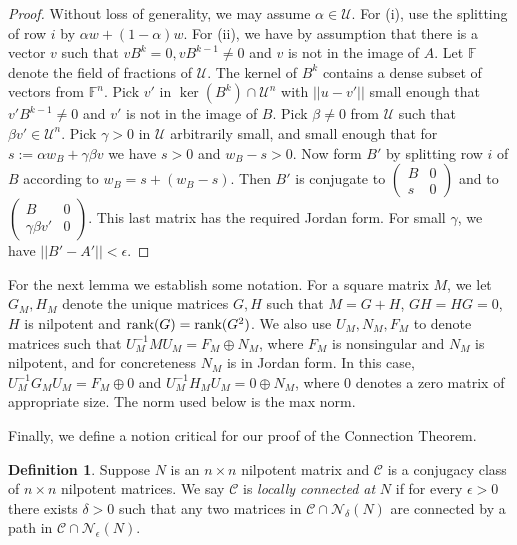 \documentclass{amsart}
\theoremstyle{definition}
\newtheorem{definition}[theorem]{Definition}
\theoremstyle{remark}
\numberwithin{equation}{section}
\begin{document}
{{\begin{proof}
 Without loss of generality, we may assume 
$\alpha \in \mathcal U$. 
For (i), use the splitting of  row $i$ by $\alpha w + (1-\alpha )w$. 
For (ii), we have by assumption that there is a vector $v$ 
such that $vB^k=0, vB^{k-1} \neq 0$ and $v$ is not in the image of 
$A$. Let $\mathbb F$ denote the field of fractions of $\mathcal U$. 
The kernel of $B^k$ contains a dense subset of vectors from 
$\mathbb F^n$. Pick $v'$ in $\ker(B^k)\cap \mathcal U^n$ with 
$||u-v'||$ small enough that $v'B^{k-1}\neq 0$ and 
$v'$ is not in the image of $B$. Pick $\beta \neq 0$ from $\mathcal U$ 
such that $\beta v'\in \mathcal U^n$. 
Pick $\gamma >0$ in $\mathcal U$ arbitrarily small, and small enough 
that for $s:= \alpha w_B + \gamma \beta v$ we have $s>0$ and 
$w_B-s>0$. Now form $B'$ by splitting row $i$ of $B$ according 
to  $w_B=s + (w_B -s)$. Then $B'$ is conjugate to 
$ \left(\begin{smallmatrix} B & 0 \\s & 0
\end{smallmatrix} \right)$ and to 
 $ \left(\begin{smallmatrix} B & 0 \\\gamma \beta v' & 0
\end{smallmatrix} \right)$. This last matrix has the required 
Jordan form. For small $\gamma$, we have $||B'-A'||< \epsilon$. 
\end{proof} 

For the next lemma we establish some notation. 
For a square matrix $M$, we let $G_M,H_M$ denote
the unique matrices $G,H$ such that $M=G+H$,
$GH=HG=0$, $H$ is nilpotent and $\textnormal{rank}(G)=
\textnormal{rank}(G^2)$. We also use $U_M,N_M,F_M$ 
to denote matrices such that $U^{-1}_MMU_M=F_M\oplus N_M$, where 
$F_M$ is nonsingular and $N_M$ is nilpotent, 
and for concreteness $N_M$ is in Jordan form.  
In this case, 
$U^{-1}_MG_MU_M=F_M\oplus 0$ and 
$U^{-1}_MH_MU_M=0\oplus N_M$, where $0$ denotes a zero 
matrix of appropriate size. 
The norm used below is the max norm. 

Finally,   we define a notion critical for our proof 
of the Connection Theorem. 

\begin{definition} \label{localconnectednessdefinition}
Suppose $N$ is an $n\times n$ nilpotent matrix and 
$\mathcal C$ is a 
 conjugacy class of  $n\times n$ 
nilpotent matrices. We say $\mathcal C$ is 
{\it locally connected at} $N$ if  for every $\epsilon >0$ 
there exists 
$\delta >0$ such that any two matrices in 
$\mathcal C \cap \mathcal N_{\delta}(N)$ are connected 
by a path in $\mathcal C \cap\mathcal N_{\epsilon}(N)$.
\end{definition} 

}}
\end{document}
